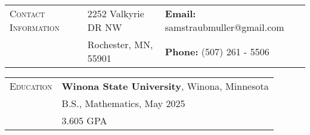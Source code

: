 \documentclass{article}
\begin{document}
\begin{tabular}{l l l}
\textsc{Contact Information} & 2252 Valkyrie DR NW & \textbf{Email:} samstraubmuller@gmail.com \\
				    & Rochester, MN, 55901 & \textbf{Phone:} (507) 261 - 5506 \\
\end{tabular}

\vspace{5mm}

\begin{tabular}{l l}
\textsc{Education} & \textbf{Winona State University}, Winona, Minnesota \\
 				  & 	\hspace{2.5mm} B.S., Mathematics, May 2025 \\
 				  & \hspace{2.5mm} 3.605 GPA \\
\end{tabular}\\

\vspace{2.5mm}
\end{document}
